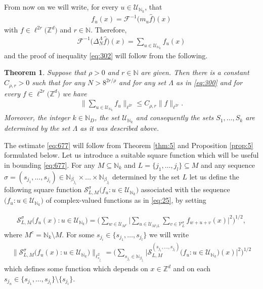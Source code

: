 \documentclass[a4paper,oneside]{amsart}
\theoremstyle{plain}
\newtheorem{theorem}{Theorem}
\theoremstyle{definition}
\numberwithin{equation}{section}
\newcounter{thm}
\theoremstyle{plain}
\newcommand{\ZZ}{\mathbb{Z}}
\newcommand{\NN}{\mathbb{N}}
\newcommand{\8}{\infty}
\begin{document}
From now on we will write, for every $u\in \mathcal
U_{\NN_k}$, that
\begin{align}
  \label{eq:25}
f_u(x)=\mathcal F^{-1}\big(m_u\hat{f}\big)(x)
\end{align}
with $f\in\ell^{2r}\big(\ZZ^d\big)$ and $r\in\NN$.
Therefore, 
\begin{align}
\label{eq:135}
   \mathcal F^{-1}\big(\Delta_N^{\Lambda}\hat{f}\big)(x)=\sum_{u\in \mathcal U_{\NN_k}}f_u(x)
\end{align}
and 
the proof of inequality  \eqref{eq:302} will follow from the
following.
\begin{theorem}
  \label{thm:500}
Suppose that $\rho>0$ and $r\in\NN$ are given. Then there is a
constant $C_{\rho, r}>0$ such that for any $N>8^{2r/\rho}$ and for any
set $\Lambda$ as in \eqref{eq:300}
and for every $f\in\ell^{2r}\big(\ZZ^d\big)$ we have  
\begin{align}
  \label{eq:677}
  \Big\|\sum_{u\in \mathcal U_{\NN_k}}f_u\Big\|_{\ell^{2r}}\le C_{\rho, r}\|f\|_{\ell^{2r}}.
\end{align}
Moreover, the integer $k\in\NN_D$, the set $\mathcal U_{\NN_k}$ and consequently  the sets $S_1,\ldots, S_k$
 are determined by the set $\Lambda$ as it was described  above.
\end{theorem}

 The
estimate \eqref{eq:677} will follow from Theorem \ref{thm:5} and
Proposition \ref{prop:5} formulated below. 
Let us introduce a suitable square function which will
be useful in bounding  \eqref{eq:677}. 
For any $M\subseteq \NN_k$ and $L=\{j_1, \ldots, j_l\}\subseteq M$ and
any sequence
  $\sigma=(s_{j_1},\ldots,s_{j_l})\in
  \NN_{\beta_{j_1}}\times\ldots\times\NN_{\beta_{j_l}}$ determined by the
  set $L$ let
us define the following square function 
$\mathcal S_{L, M}^{\sigma}\big(f_u:u\in\mathcal
  U_{\NN_k}\big)$  
associated with the sequence $\big(f_u:u\in\mathcal
  U_{\NN_k}\big)$ of complex-valued functions as in \eqref{eq:25}, by setting

\begin{align}
  \label{eq:44}
  \mathcal S_{L, M}^{\sigma}\big(f_u(x):u\in\mathcal
  U_{\NN_k}\big)=\bigg(
\sum_{w\in\mathcal U_{M^c}}\Big|\sum_{u\in\mathcal U_{M\setminus
    L}}\sum_{v\in\mathcal V_{L}^{\sigma}}f_{w+u+v}(x)\Big|^2\bigg)^{1/2},
\end{align}
where $M^c=\NN_k\setminus M$.
For some $s_{j_i}\in\{s_{j_1}, \ldots, s_{j_l}\}$ we will write
\begin{align*}
  \big\|\mathcal S_{L, M}^{\sigma}\big(f_u(x):u\in\mathcal
  U_{\NN_k}\big)\big\|_{\ell^2_{s_{j_i}}}=\bigg(\sum_{s_{j_i}\in\NN_{\beta_{j_i}}}
\big|\mathcal S_{L, M}^{(s_{j_1},\ldots,s_{j_l})}\big(f_u:u\in\mathcal
  U_{\NN_k}\big)(x)\big|^2\bigg)^{1/2}
\end{align*}
which defines some function which depends on $x\in\ZZ^d$ and on each
$s_{j_n}\in \{s_{j_1}, \ldots, s_{j_l}\}\setminus\{s_{j_i}\}$.
\end{document}
